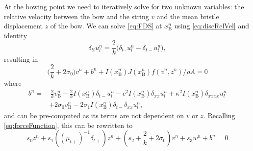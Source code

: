 \documentclass[twoside,a4paper,dvipsnames]{article}
\def\SBcomment[#1]{\textcolor{Red}{}}
\def\SWcomment[#1]{\textcolor{Green}{}}
\begin{document}
At the bowing point we need to iteratively solve for two unknown variables: the relative velocity between the bow and the string $v$ and the mean bristle displacement $z$ of the bow.
We can solve \eqref{eq:FDS} at $x_\text{B}^n$ using \eqref{eq:discRelVel} and identity \cite{Bilbao2009}
\begin{equation}
    \delta_{tt}u_l^n = \frac{2}{k}\big(\delta_{t\cdot}u_l^n-\delta_{t-}u_l^n\big),
\end{equation}
resulting in 
\begin{equation} \label{eq:incIdentity}
    \Big(\frac{2}{k}+2\sigma_{0}\Big) v^n +b^n+I(x_\text{B}^n)J(x_\text{B}^n)f(v^n,z^n)/\rho A = 0
\end{equation}
\SWcomment[or does this still need to be scaled by 1/h for it to be correctly solved in NR?]{}\SBcomment[Yes, you need the $1/h$...but (15) is only true if you use a pure spreading function selecting just one point...why not just do this? Otherwise you need to worry about the size of I*J. If you're moving the bow around, though, you definitely need this product though. ]where 
\begin{equation}
        \begin{aligned}b^n =& \: \frac{2}{k}v_\text{B}^n-\frac{2}{k}I(x_\text{B}^n)\delta_{t-}u_l^n - c^2 I(x_\text{B}^n)\delta_{xx} u_l^n +\kappa^2I(x_\text{B}^n)\delta_{xxxx} u_l^n \\
    &+ 2\sigma_0v_\text{B}^n -2\sigma_1I(x_\text{B}^n)\delta_{t-}\delta_{xx}u_l^n,
\end{aligned}
\end{equation}
\SWcomment[Changed the $\beta$ back as this sentence applies specifically to $b^n$ and will be less confusing.$\rightarrow$ ]and can be pre-computed as its terms are not dependent on $v$ or $z$. Recalling \eqref{eq:forceFunction}, this can be rewritten to
\begin{equation}\label{eq:newtonFunction}
    s_0z^n+s_1((\mu_{t+})^{-1}\delta_{t+}) z^n+(s_2 + \frac{2}{k} + 2\sigma_0)v^n+s_3w^n
    + b^n = 0
    \end{equation}
\end{document}
